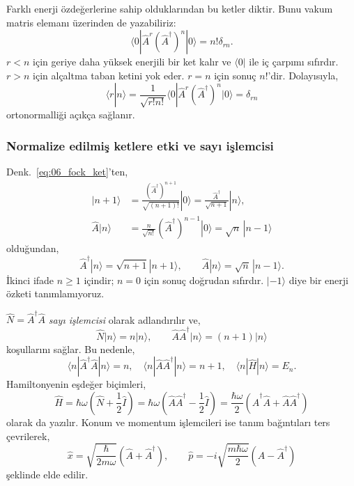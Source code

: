\documentclass[00_kitap.tex]{subfiles}
\begin{document}
Farklı enerji özdeğerlerine sahip olduklarından bu ketler diktir.
Bunu vakum matris elemanı üzerinden de yazabiliriz:
\begin{equation}
 \boxed{\langle0|\hat A^r(\hat A^\dagger)^n|0\rangle
        =n!\delta_{rn}.}
 \label{eq:06_vakum_carpim}
\end{equation}
$r<n$ için geriye daha yüksek enerjili bir ket kalır ve
$\langle0|$ ile iç çarpımı sıfırdır. $r>n$ için alçaltma taban
ketini yok eder. $r=n$ için sonuç $n!$'dir. Dolayısıyla,
\begin{equation}
 \langle r|n\rangle
 =\frac{1}{\sqrt{r!n!}}
 \langle0|\hat A^r(\hat A^\dagger)^n|0\rangle=\delta_{rn}
\end{equation}
ortonormalliği açıkça sağlanır.

\subsubsection{Normalize edilmiş ketlere etki ve sayı işlemcisi}

Denk.~\eqref{eq:06_fock_ket}'ten,
\begin{align}
 |n+1\rangle
 &=\frac{(\hat A^\dagger)^{n+1}}{\sqrt{(n+1)!}}|0\rangle
 =\frac{\hat A^\dagger}{\sqrt{n+1}}|n\rangle,\\
 \hat A|n\rangle
 &=\frac{n}{\sqrt{n!}}(\hat A^\dagger)^{n-1}|0\rangle
 =\sqrt n\,|n-1\rangle
\end{align}
olduğundan,
\begin{equation}
 \boxed{\hat A^\dagger|n\rangle=\sqrt{n+1}|n+1\rangle,
 \qquad \hat A|n\rangle=\sqrt n\,|n-1\rangle.}
 \label{eq:06_merdiven_etki}
\end{equation}
İkinci ifade $n\ge1$ içindir; $n=0$ için sonuç doğrudan sıfırdır.
$|-1\rangle$ diye bir enerji özketi tanımlamıyoruz.

$\hat N=\hat A^\dagger\hat A$ \emph{sayı işlemcisi} olarak
adlandırılır ve,
\begin{equation}
 \hat N|n\rangle=n|n\rangle,\qquad
 \hat A\hat A^\dagger|n\rangle=(n+1)|n\rangle
\end{equation}
koşullarını sağlar. Bu nedenle,
\begin{equation}
 \langle n|\hat A^\dagger\hat A|n\rangle=n,
 \quad\langle n|\hat A\hat A^\dagger|n\rangle=n+1,
 \quad\langle n|\hat H|n\rangle=E_n.
\end{equation}
Hamiltonyenin eşdeğer biçimleri,
\begin{equation}
 \hat H=\hbar\omega\left(\hat N+\frac12\hat I\right)
 =\hbar\omega\left(\hat A\hat A^\dagger-\frac12\hat I\right)
 =\frac{\hbar\omega}{2}
    (\hat A^\dagger\hat A+\hat A\hat A^\dagger)
\end{equation}
olarak da yazılır. Konum ve momentum işlemcileri ise tanım
bağıntıları ters çevrilerek,
\begin{equation}
 \hat x=\sqrt{\frac{\hbar}{2m\omega}}(\hat A+\hat A^\dagger),
 \qquad
 \hat p=-i\sqrt{\frac{m\hbar\omega}{2}}(\hat A-\hat A^\dagger)
 \label{eq:06_xp_merdiven}
\end{equation}
şeklinde elde edilir.
\end{document}
